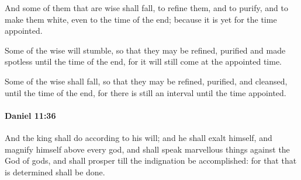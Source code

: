 			\begin{versebox}
					\item[BHS] 
					\item[LXX] 
					\item[ASV] And some of them that are wise shall fall, to refine them, and to purify, and to make them white, even to the time of the end; because it is yet for the time appointed.
					\item[NIV] Some of the wise will stumble, so that they may be refined, purified and made spotless until the time of the end, for it will still come at the appointed time.
					\item[NRSV] Some of the wise shall fall, so that they may be refined, purified, and cleansed, until the time of the end, for there is still an interval until the time appointed.
			\end{versebox}

		\paragraph{Daniel 11:36} %
			\label{DANIEL-11-36}

			And the king shall do according to his will; and he shall exalt himself, and magnify himself above every god, and shall speak marvellous things against the God of gods, and shall prosper till the indignation be accomplished: for that that is determined shall be done.

